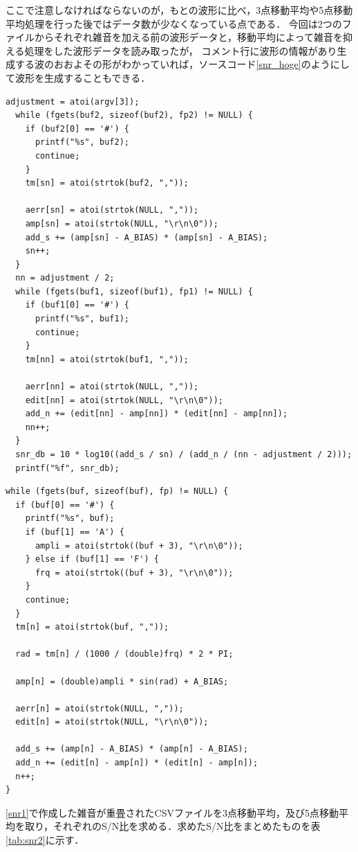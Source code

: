 \documentclass[titlepage]{jarticle}
\begin{document}
ここで注意しなければならないのが，もとの波形に比べ，3点移動平均や5点移動平均処理を行った後ではデータ数が少なくなっている点である．
今回は2つのファイルからそれぞれ雑音を加える前の波形データと，移動平均によって雑音を抑える処理をした波形データを読み取ったが，
コメント行に波形の情報があり生成する波のおおよその形がわかっていれば，ソースコード\ref{snr_hoge}のようにして波形を生成することもできる．
\begin{lstlisting}[caption=snr2.cの主要部,label=snr2.c]
  adjustment = atoi(argv[3]);
  while (fgets(buf2, sizeof(buf2), fp2) != NULL) {
    if (buf2[0] == '#') {
      printf("%s", buf2);
      continue;
    }
    tm[sn] = atoi(strtok(buf2, ","));

    aerr[sn] = atoi(strtok(NULL, ","));
    amp[sn] = atoi(strtok(NULL, "\r\n\0"));
    add_s += (amp[sn] - A_BIAS) * (amp[sn] - A_BIAS);
    sn++;
  }
  nn = adjustment / 2;
  while (fgets(buf1, sizeof(buf1), fp1) != NULL) {
    if (buf1[0] == '#') {
      printf("%s", buf1);
      continue;
    }
    tm[nn] = atoi(strtok(buf1, ","));

    aerr[nn] = atoi(strtok(NULL, ","));
    edit[nn] = atoi(strtok(NULL, "\r\n\0"));
    add_n += (edit[nn] - amp[nn]) * (edit[nn] - amp[nn]);
    nn++;
  }
  snr_db = 10 * log10((add_s / sn) / (add_n / (nn - adjustment / 2)));
  printf("%f", snr_db);
\end{lstlisting}
\begin{lstlisting}[caption=波形情報が既知の場合のsnr2.cの主要部,label=snr_hoge]
  while (fgets(buf, sizeof(buf), fp) != NULL) {
  if (buf[0] == '#') {
    printf("%s", buf);
    if (buf[1] == 'A') {
      ampli = atoi(strtok((buf + 3), "\r\n\0"));
    } else if (buf[1] == 'F') {
      frq = atoi(strtok((buf + 3), "\r\n\0"));
    }
    continue;
  }
  tm[n] = atoi(strtok(buf, ","));

  rad = tm[n] / (1000 / (double)frq) * 2 * PI;

  amp[n] = (double)ampli * sin(rad) + A_BIAS;

  aerr[n] = atoi(strtok(NULL, ","));
  edit[n] = atoi(strtok(NULL, "\r\n\0"));

  add_s += (amp[n] - A_BIAS) * (amp[n] - A_BIAS);
  add_n += (edit[n] - amp[n]) * (edit[n] - amp[n]);
  n++;
}
\end{lstlisting}
\ref{snr1}で作成した雑音が重畳されたCSVファイルを3点移動平均，及び5点移動平均を取り，それぞれのS/N比を求める．求めたS/N比をまとめたものを表\ref{tab:snr2}に示す．
\end{document}
